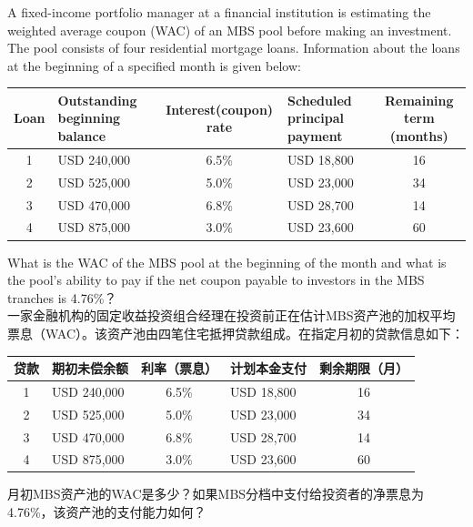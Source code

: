 \documentclass{article}
\newcounter{question} %
\begin{document}
\begin{question}
    A fixed-income portfolio manager at a financial institution is estimating the weighted average coupon (WAC) of an MBS pool before making an investment. The pool consists of four residential mortgage loans. Information about the loans at the beginning of a specified month is given below:

    \begin{table}[H]
        \centering
        \begin{tabular}{|c|l|c|l|c|}
        \hline
        Loan & Outstanding beginning balance & Interest(coupon) rate & Scheduled principal payment & Remaining term (months) \\
        \hline
        1 & USD 240,000 & 6.5\% & USD 18,800 & 16 \\
        \hline
        2 & USD 525,000 & 5.0\% & USD 23,000 & 34 \\
        \hline
        3 & USD 470,000 & 6.8\% & USD 28,700 & 14 \\
        \hline
        4 & USD 875,000 & 3.0\% & USD 23,600 & 60 \\
        \hline
        \end{tabular}
    \end{table}

    What is the WAC of the MBS pool at the beginning of the month and what is the pool's ability to pay if the net coupon payable to investors in the MBS tranches is 4.76\%？
    \\一家金融机构的固定收益投资组合经理在投资前正在估计MBS资产池的加权平均票息（WAC）。该资产池由四笔住宅抵押贷款组成。在指定月初的贷款信息如下：

    \begin{table}[H]
        \centering
        \begin{tabular}{|c|l|c|l|c|}
        \hline
        贷款 & 期初未偿余额 & 利率（票息） & 计划本金支付 & 剩余期限（月） \\
        \hline
        1 & USD 240,000 & 6.5\% & USD 18,800 & 16 \\
        \hline
        2 & USD 525,000 & 5.0\% & USD 23,000 & 34 \\
        \hline
        3 & USD 470,000 & 6.8\% & USD 28,700 & 14 \\
        \hline
        4 & USD 875,000 & 3.0\% & USD 23,600 & 60 \\
        \hline
        \end{tabular}
    \end{table}

    月初MBS资产池的WAC是多少？如果MBS分档中支付给投资者的净票息为4.76\%，该资产池的支付能力如何？
\end{question}
\end{document}
